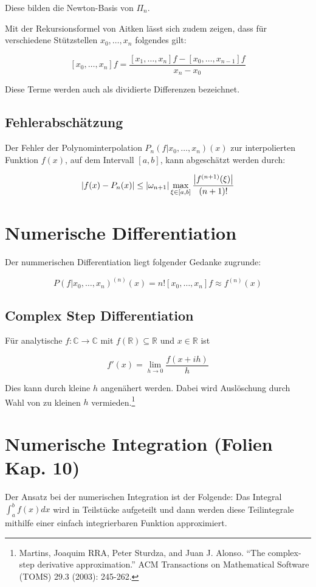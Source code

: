 \documentclass[a4paper,parskip=half*,DIV=7,fontsize=11pt]{scrartcl}
\DeclarePairedDelimiter\abs{\lvert}{\rvert}
\begin{document}
Diese bilden die Newton-Basis von $\Pi_n$.

Mit der Rekursionsformel von Aitken lässt sich zudem zeigen, dass für verschiedene Stützstellen $x_0,\ldots,x_n$ folgendes gilt:

\[ [x_0,\ldots,x_n]f = \frac{[x_1,\ldots, x_n]f - [x_0,\ldots, x_{n-1}]f}{x_n - x_0} \]

Diese Terme werden auch als dividierte Differenzen bezeichnet.

\subsection{Fehlerabschätzung}
Der Fehler der Polynominterpolation $P_n (f|x_0,\ldots,x_n) (x)$ zur interpolierten Funktion $f(x)$, auf dem Intervall $[a,b]$, kann abgeschätzt werden durch:

\[\abs*{f(x) - P_n (x)} \leq \abs*{\omega_{n+1}} \max_{\xi \in [a,b]} \frac{\abs*{f^{(n+1)}(\xi)}}{(n+1)!}\]

\section{Numerische Differentiation}

Der nummerischen Differentiation liegt folgender Gedanke zugrunde:

\[P(f|x_0, \ldots, x_n)^{(n)} (x) = n![x_0,\ldots,x_n]f \approx f^{(n)} (x)\]

\subsection{Complex Step Differentiation}

Für analytische $f: \mathbb{C} \to \mathbb{C}$ mit $f(\mathbb{R}) \subseteq \mathbb{R}$ und $x \in \mathbb{R}$ ist

\[ f'(x) = \lim_{h \to 0} \frac{f(x+ih)}{h} \]

Dies kann durch kleine $h$ angenähert werden. Dabei wird Auslöschung durch Wahl von zu kleinen $h$ vermieden.\footnote{Martins, Joaquim RRA, Peter Sturdza, and Juan J. Alonso. ``The complex-step derivative approximation.'' ACM Transactions on Mathematical Software (TOMS) 29.3 (2003): 245-262.}

\section{Numerische Integration (Folien Kap. 10)}

Der Ansatz bei der numerischen Integration ist der Folgende: Das Integral $\int_a^b f(x) dx$ wird in Teilstücke aufgeteilt und dann werden diese Teilintegrale mithilfe einer einfach integrierbaren Funktion approximiert. 
\end{document}
